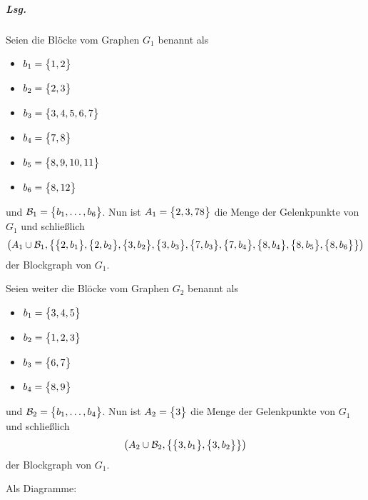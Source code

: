 \documentclass{scrreprt}
\begin{document}
\begin{itemize}
  \subparagraph{Lsg.} Seien die Blöcke vom Graphen $G_1$ benannt als
  \begin{itemize}
  \item \colorbox{green!20}{$b_1 = \qty\big{1, 2}$}
  \item \colorbox{teal!30}{$b_2 = \qty\big{2, 3}$}
  \item \colorbox{orange!30}{$b_3 = \qty\big{3, 4, 5, 6, 7}$}
  \item \colorbox{magenta!30}{$b_4 = \qty\big{7, 8}$}
  \item \colorbox{blue!20}{$b_5 = \qty\big{8, 9, 10, 11}$}
  \item \colorbox{red!20}{$b_6 = \qty\big{8, 12}$}
  \end{itemize}
  und $\mathcal{B}_1 = \qty\big{b_1, \ldots, b_6}$.
  Nun ist $A_1 = \qty\big{2, 3, 7 8}$ die Menge der Gelenkpunkte von $G_1$ und
  schließlich
  \[
    \qty(A_1 \cup \mathcal{B}_1, \qty{
      \qty\big{2, b_1},
      \qty\big{2, b_2},
      \qty\big{3, b_2},
      \qty\big{3, b_3},
      \qty\big{7, b_3},
      \qty\big{7, b_4},
      \qty\big{8, b_4},
      \qty\big{8, b_5},
      \qty\big{8, b_6}
    })
  \]
  der Blockgraph von $G_1$.

  \newpage
  Seien weiter die Blöcke vom Graphen $G_2$ benannt als
  \begin{itemize}
  \item \colorbox{blue!20}{$b_1 = \qty\big{3, 4, 5}$}
  \item \colorbox{red!20}{$b_2 = \qty\big{1, 2, 3}$}
  \item \colorbox{green!20}{$b_3 = \qty\big{6, 7}$}
  \item \colorbox{orange!30}{$b_4 = \qty\big{8, 9}$}
  \end{itemize}
  und $\mathcal{B}_2 = \qty\big{b_1, \ldots, b_4}$.
  Nun ist $A_2 = \qty\big{3}$ die Menge der Gelenkpunkte von $G_1$ und
  schließlich
  \[
    \qty(A_2 \cup \mathcal{B}_2, \qty{
      \qty\big{3, b_1},
      \qty\big{3, b_2}
    })
  \]
  der Blockgraph von $G_1$.

  Als Diagramme:


\end{itemize}
\end{document}
